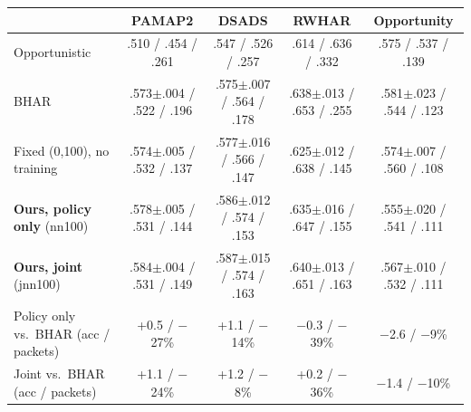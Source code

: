 \documentclass[border=6pt]{standalone}
\begin{document}
\small
\begin{tabular}{lcccc}
\toprule
 & PAMAP2 & DSADS & RWHAR & Opportunity \\
\midrule
Opportunistic & .510 / .454 / .261 & .547 / .526 / .257 & .614 / .636 / .332 & .575 / .537 / .139 \\
BHAR & .573$\pm$.004 / .522 / .196 & .575$\pm$.007 / .564 / .178 & .638$\pm$.013 / .653 / .255 & .581$\pm$.023 / .544 / .123 \\
Fixed (0,100), no training & .574$\pm$.005 / .532 / .137 & .577$\pm$.016 / .566 / .147 & .625$\pm$.012 / .638 / .145 & .574$\pm$.007 / .560 / .108 \\
\textbf{Ours, policy only} (nn100) & .578$\pm$.005 / .531 / .144 & .586$\pm$.012 / .574 / .153 & .635$\pm$.016 / .647 / .155 & .555$\pm$.020 / .541 / .111 \\
\textbf{Ours, joint} (jnn100) & .584$\pm$.004 / .531 / .149 & .587$\pm$.015 / .574 / .163 & .640$\pm$.013 / .651 / .163 & .567$\pm$.010 / .532 / .111 \\
\midrule
Policy only vs.\ BHAR (acc / packets) & +0.5 / $-$27\% & +1.1 / $-$14\% & $-$0.3 / $-$39\% & $-$2.6 / $-$9\% \\
Joint vs.\ BHAR (acc / packets) & +1.1 / $-$24\% & +1.2 / $-$8\% & +0.2 / $-$36\% & $-$1.4 / $-$10\% \\
\bottomrule
\end{tabular}
\end{document}
